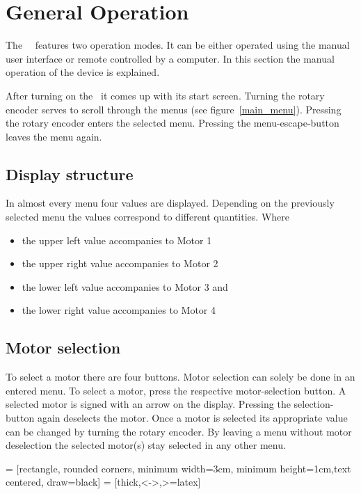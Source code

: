 \section{General Operation}
The \productNumber ~\productName ~features two operation modes. It can be
either operated using the manual user interface or remote controlled by a
computer. In this section the manual operation of the device is explained.

After turning on the \productName ~it comes up with its start screen.
Turning the rotary encoder serves to scroll through the menus (see
figure~\ref{main_menu}). Pressing the rotary encoder enters the selected
menu. Pressing the menu-escape-button leaves the menu again.

\subsection{Display structure}
In almost every menu four values are displayed. Depending on the previously
selected menu the values correspond to different quantities. Where
\begin{itemize}
  \item the upper left value accompanies to Motor 1
  \item the upper right value accompanies to Motor 2
  \item the lower left value accompanies to Motor 3 and
  \item the lower right value accompanies to Motor 4
\end{itemize}

\subsection{Motor selection}
To select a motor there are four buttons. Motor selection can solely be
done in an entered menu. To select a motor, press the respective motor-selection
button. A selected motor is signed with an arrow on the display. Pressing the
selection-button again deselects the motor. Once a motor is selected its
appropriate value can be changed by turning the rotary encoder. By leaving
a menu without motor deselection the selected motor(s) stay selected in any
other menu.

 = [rectangle, rounded corners, minimum width=3cm, minimum height=1cm,text centered, draw=black]
 = [thick,<->,>=latex]
\def \textWidth {7cm}


